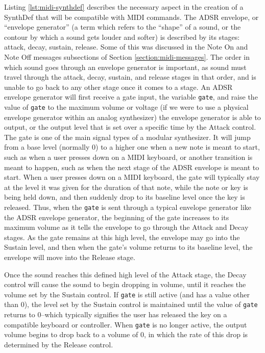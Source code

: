 Listing \ref{lst:midi-synthdef} describes the necessary aspect in the creation of a SynthDef that will  be compatible with MIDI commands. The ADSR envelope, or ``envelope generator'' (a term which refers to the ``shape'' of a sound, or the contour by which a sound gets louder and softer) is described by its stages: attack, decay, sustain, release. Some of this was discussed in the Note On and Note Off messages subsections of Section \ref{section:midi-messages}. The order in which sound goes through an envelope generator is important, as sound must travel through the attack, decay, sustain, and release stages in that order, and is unable to go back to any other stage once it comes to a stage. An ADSR envelope generator will first receive a gate input, the variable \texttt{gate}, and raise the value of \texttt{gate} to the maximum volume or voltage (if we were to use a physical envelope generator within an analog synthesizer) the envelope generator is able to output, or the output level that is set over a specific time by the Attack control. The gate is one of the main signal types of a modular synthesizer. It will jump from a base level (normally 0) to a higher one when a new note is meant to start, such as when a user presses down on a MIDI keyboard, or another transition is meant to happen, such as when the next stage of the ADSR envelope is meant to start. When a user presses down on a MIDI keyboard, the gate will typically stay at the level it was given for the duration of that note, while the note or key is being held down, and then suddenly drop to its baseline level once the key is released. Thus, when the \texttt{gate} is sent through a typical envelope generator like the ADSR envelope generator, the beginning of the gate increases to its maximum volume as it tells the envelope to go through the Attack and Decay stages. As the gate remains at this high level, the envelope may go into the Sustain level, and then when the gate's volume returns to its baseline level, the envelope will move into the Release stage. 

Once the sound reaches this defined high level of the Attack stage, the Decay control will cause the sound to begin dropping in volume, until it reaches the volume set by the Sustain control. If \texttt{gate} is still active (and has a value other than 0), the level set by the Sustain control is maintained until the value of \texttt{gate} returns to 0--which typically signifies the user has released the key on a compatible keyboard or controller. When \texttt{gate} is no longer active, the output volume begins to drop back to a volume of 0, in which the rate of this drop is determined by the Release control. 

